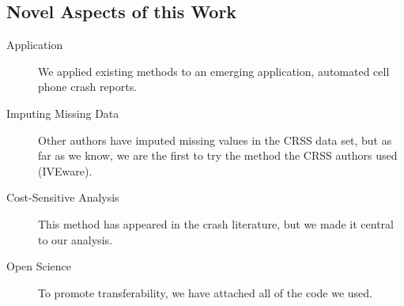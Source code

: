\subsection{Novel Aspects of this Work}

\begin{description}
	\item [Application] We applied existing methods to an emerging application, automated cell phone crash reports.
	\item [Imputing Missing Data]  Other authors have imputed missing values in the CRSS data set, but as far as we know, we are the first to try the method the CRSS authors used (IVEware).
	\item [Cost-Sensitive Analysis] This method has appeared in the crash literature, but we made it central to our analysis.
	\item [Open Science] To promote transferability, we have attached all of the code we used.
\end{description}